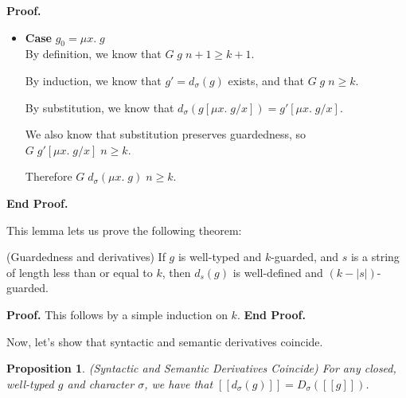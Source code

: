 \documentclass{article}
\newcommand{\fix}[2]{\mu {#1}.\;{#2}}
\newcommand{\interp}[1]{[\![{#1}]\!]}
\newcommand{\semderiv}[2]{D_{#1}({#2})}
\newcommand{\deriv}[2]{d_{#1}({#2})}
\newtheorem{prop}{Proposition}
\newenvironment{proof}{\noindent\textbf{Proof.}}
{\noindent\textbf{End Proof.}}
\newenvironment{caseblock}{\begin{itemize}}{\end{itemize}}
\newenvironment{case}[1]{\item \textbf{Case} {#1}\\}{}
\begin{document}
\begin{proof}
\begin{caseblock}
\begin{case}{$g_0 = \fix{x}{g}$}
      By definition, we know that $G\;g\;n+1 \geq k+1$. 

      By induction, we know that $g' = \deriv{\sigma}{g}$ exists, 
      and that $G\;g\;n \geq k$. 

      By substitution, we know that $\deriv{\sigma}{g[\fix{x}{g}/x]} = 
      g'[\fix{x}{g}/x]$. 

      We also know that substitution preserves guardedness, so 
      $G\;g'[\fix{x}{g}/x]\;n \geq k$. 

      Therefore $G\;\deriv{\sigma}{\fix{x}{g}}\;n \geq k$. 
    \end{case}
  \end{caseblock}
\end{proof}

This lemma lets us prove the following theorem: 

\begin{theorem}{(Guardedness and derivatives)}
If $g$ is well-typed and $k$-guarded, and $s$ is a string of length less than or equal to $k$, 
then $\deriv{s}{g}$ is well-defined and $(k - |s|)$-guarded. 
\end{theorem}

\begin{proof}
  This follows by a simple induction on $k$. 
\end{proof}

Now, let's show that syntactic and semantic derivatives coincide. 

\begin{prop}{(Syntactic and Semantic Derivatives Coincide)}
For any closed, well-typed $g$ and character $\sigma$, we have that
$\interp{\deriv{\sigma}{g}} = \semderiv{\sigma}{\interp{g}}$.
\end{prop}
\end{document}
